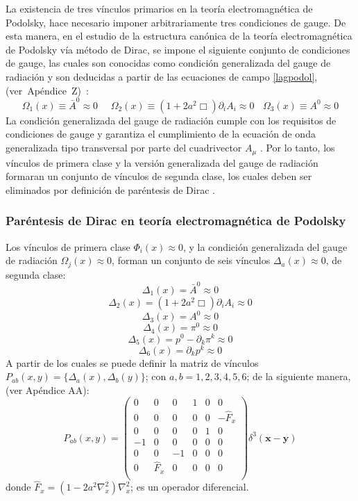 \documentclass[a4paper,12pt]{article}
\begin{document}
La existencia de tres vínculos primarios en la teoría electromagnética de Podolsky, hace necesario imponer arbitrariamente tres condiciones de gauge. De esta manera, en el estudio de la estructura canónica de la teoría electromagnética de Podolsky vía método de Dirac, se impone el siguiente conjunto de condiciones de gauge, las cuales son conocidas como condición generalizada del gauge de radiación y son deducidas a partir de las ecuaciones de campo \eqref{lagpodol}, \mbox{(ver Apéndice Z) \cite{podolsky}:} 
\begin{equation}
\Omega_1(x)\equiv\bar{A}^0\approx0 \ \  \ \ \ \ \Omega_2(x)\equiv (1+2a^2\Box)\partial_i A_i\approx0  \ \  \ \ \Omega_3(x)\equiv A^0\approx0 
\label{gara}
\end{equation}
La condición generalizada del gauge de radiación cumple con los requisitos de condiciones de gauge y garantiza el cumplimiento de la ecuación de onda generalizada tipo transversal por parte del cuadrivector $A_\mu$ \cite{podolsky}. Por lo tanto, los vínculos de primera clase y la versión generalizada del gauge de radiación formaran un conjunto de vínculos de segunda clase, los cuales deben ser eliminados por definición de paréntesis de Dirac \cite{dirac,puebla,Merilin}.
\subsubsection{Paréntesis de Dirac en teoría \mbox{electromagnética} de Podolsky}
Los vínculos de primera clase $\Phi_i(x)\approx0$, y la condición generalizada del gauge de radiación $\Omega_j(x)\approx0$, forman un conjunto de seis vínculos $\Delta_a(x)\approx0$, de segunda clase:
\begin{equation}
\Delta_1(x)=\bar{A}^0\approx0 
\label{seclas}
\end{equation}
$$\Delta_2(x)= (1+2a^2\Box)\partial_i A_i\approx0$$
$$ \Delta_3(x)= A^0\approx0$$
$$\Delta_4(x)=\pi^0\approx0$$
$$\Delta_5(x)=p^0-\partial_k\pi^k\approx0$$
$$\Delta_6(x)=\partial_kp^{k}\approx0 $$
A partir de los cuales se puede definir la matriz de vínculos \mbox{$P_{ab}(x,y)=\{\Delta_a(x),\Delta_b(y)\}$}; con $a,b=1,2,3,4,5,6$; de la siguiente manera, (ver Apéndice AA):
\begin{equation}
P_{ab}(x,y)=\left(\begin{matrix}
0 & 0 & 0 & 1 & 0 & 0\\
 0 & 0 & 0 & 0 & 0 & -\hat{F}_x\\
 0 & 0 & 0 & 0 & 1 & 0 \\
 -1  & 0 & 0 & 0 & 0 & 0\\
 0 & 0 & -1 & 0 & 0 & 0 \\
0 & \hat{F}_x & 0 & 0 & 0 & 0 \\
\end{matrix}\right)\delta^3(\textbf{x}-\textbf{y}) 
\end{equation}
donde \mbox{$\hat{F}_x=(1-2a^2\nabla^2_x)\nabla^2_x$}; es un operador diferencial.
\\
\end{document}
